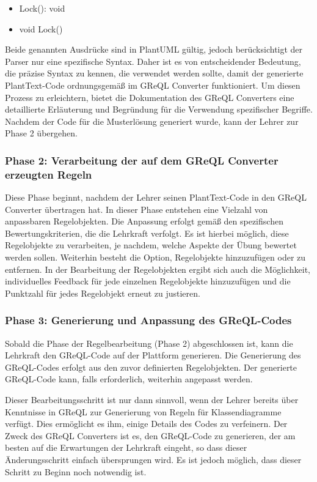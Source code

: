\begin{itemize}
    \item Lock(): void
    \item void Lock()
\end{itemize}


Beide genannten Ausdrücke sind in PlantUML gültig, jedoch berücksichtigt der Parser nur eine spezifische Syntax. Daher
ist es von entscheidender Bedeutung, die präzise Syntax zu kennen, die verwendet werden sollte, damit der generierte
PlantText-Code ordnungsgemäß im GReQL Converter funktioniert. Um diesen Prozess zu erleichtern, bietet die Dokumentation
des GReQL Converters eine detaillierte Erläuterung und Begründung für die Verwendung spezifischer Begriffe. Nachdem der
Code für die Musterlösung generiert wurde, kann der Lehrer zur Phase 2 übergehen.

\subsubsection{Phase 2: Verarbeitung der auf dem \gls{GReQL Converter} erzeugten Regeln}

Diese Phase beginnt, nachdem der Lehrer seinen PlantText-Code in den \gls{GReQL Converter} übertragen hat.
In dieser Phase entstehen eine Vielzahl von anpassbaren Regelobjekten. Die Anpassung erfolgt gemäß den spezifischen
Bewertungskriterien, die die Lehrkraft verfolgt. Es ist hierbei möglich, diese Regelobjekte zu verarbeiten, je nachdem,
welche Aspekte der Übung bewertet werden sollen. Weiterhin besteht die Option, Regelobjekte hinzuzufügen oder zu
entfernen. In der Bearbeitung der Regelobjekten ergibt sich auch die Möglichkeit, individuelles Feedback für jede
einzelnen Regelobjekte hinzuzufügen und die Punktzahl für jedes Regelobjekt erneut zu justieren.


\subsubsection{Phase 3: Generierung und Anpassung des GReQL-Codes}

Sobald die Phase der Regelbearbeitung (Phase 2) abgeschlossen ist, kann die Lehrkraft den GReQL-Code auf der Plattform
generieren. Die Generierung des GReQL-Codes erfolgt aus den zuvor definierten Regelobjekten. Der generierte GReQL-Code kann,
falls erforderlich, weiterhin angepasst werden.

Dieser Bearbeitungsschritt ist nur dann sinnvoll, wenn der Lehrer bereits über Kenntnisse in GReQL zur Generierung von
Regeln für Klassendiagramme verfügt. Dies ermöglicht es ihm, einige Details des Codes zu verfeinern. Der Zweck des
\gls{GReQL Converter}s ist es, den GReQL-Code zu generieren, der am besten auf die Erwartungen der Lehrkraft eingeht, so dass
dieser Änderungsschritt einfach übersprungen wird. Es ist jedoch möglich, dass dieser Schritt zu Beginn noch notwendig
ist.

